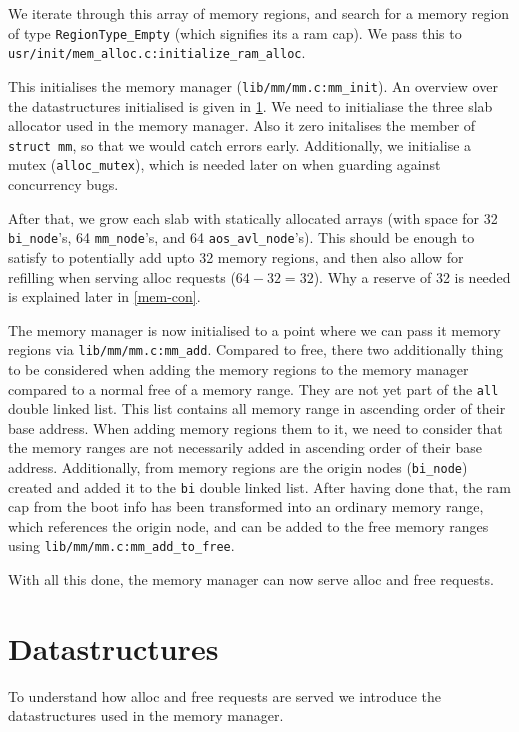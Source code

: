 We iterate through this array of memory regions, and search for a memory region
of type \verb|RegionType_Empty| (which signifies its a ram cap).
We pass this to \verb|usr/init/mem_alloc.c:initialize_ram_alloc|.

This initialises the memory manager (\verb|lib/mm/mm.c:mm_init|).
An overview over the datastructures initialised is given in \ref{mem-data}.
We need to initialiase the three slab allocator used in the memory manager.
Also it zero initalises the member of \verb|struct mm|, so that we would catch
errors early.
Additionally, we initialise a mutex (\verb|alloc_mutex|), which is needed later
on when guarding against concurrency bugs.

After that, we grow each slab with statically allocated arrays (with space for
32 \verb|bi_node|'s, 64 \verb|mm_node|'s, and 64 \verb|aos_avl_node|'s).
This should be enough to satisfy to potentially add upto 32 memory regions,
and then also allow for refilling when serving alloc requests ($64-32=32$).
Why a reserve of 32 is needed is explained later in \ref{mem-con}.

The memory manager is now initialised to a point where we can pass it memory
regions via \verb|lib/mm/mm.c:mm_add|.
Compared to free, there two additionally thing to be considered when adding the
memory regions to the memory manager compared to a normal free of a memory
range.
They are not yet part of the \verb|all| double linked list.
This list contains all memory range in ascending order of their base address.
When adding memory regions them to it, we need to consider that the memory
ranges are not necessarily added in ascending order of their base address.
Additionally, from memory regions are the origin nodes (\verb|bi_node|) created
and added it to the \verb|bi| double linked list.
After having done that, the ram cap from the boot info has been transformed into
an ordinary memory range, which references the origin node, and can be added to
the free memory ranges using \verb|lib/mm/mm.c:mm_add_to_free|.

With all this done, the memory manager can now serve alloc and free requests.

\section{Datastructures} \label{mem-data}

To understand how alloc and free requests are served we introduce the
datastructures used in the memory manager.

